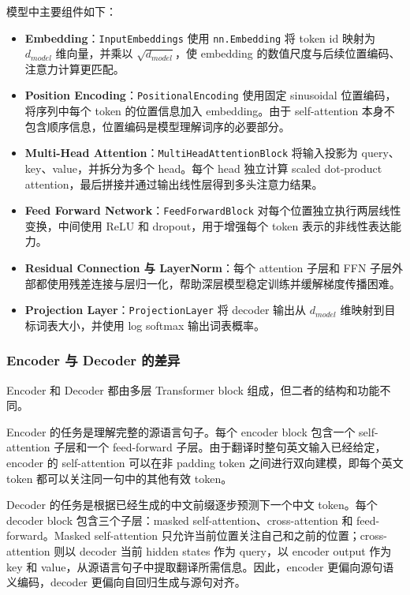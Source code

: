 ﻿\documentclass[UTF8,a4paper,12pt]{ctexart}
\begin{document}
模型中主要组件如下：
\begin{itemize}
  \item \textbf{Embedding}：\texttt{InputEmbeddings} 使用 \texttt{nn.Embedding} 将 token id 映射为 $d_{model}$ 维向量，并乘以 $\sqrt{d_{model}}$，使 embedding 的数值尺度与后续位置编码、注意力计算更匹配。
  \item \textbf{Position Encoding}：\texttt{PositionalEncoding} 使用固定 sinusoidal 位置编码，将序列中每个 token 的位置信息加入 embedding。由于 self-attention 本身不包含顺序信息，位置编码是模型理解词序的必要部分。
  \item \textbf{Multi-Head Attention}：\texttt{MultiHeadAttentionBlock} 将输入投影为 query、key、value，并拆分为多个 head。每个 head 独立计算 scaled dot-product attention，最后拼接并通过输出线性层得到多头注意力结果。
  \item \textbf{Feed Forward Network}：\texttt{FeedForwardBlock} 对每个位置独立执行两层线性变换，中间使用 ReLU 和 dropout，用于增强每个 token 表示的非线性表达能力。
  \item \textbf{Residual Connection 与 LayerNorm}：每个 attention 子层和 FFN 子层外部都使用残差连接与层归一化，帮助深层模型稳定训练并缓解梯度传播困难。
  \item \textbf{Projection Layer}：\texttt{ProjectionLayer} 将 decoder 输出从 $d_{model}$ 维映射到目标词表大小，并使用 log softmax 输出词表概率。
\end{itemize}

\subsubsection{Encoder 与 Decoder 的差异}

Encoder 和 Decoder 都由多层 Transformer block 组成，但二者的结构和功能不同。

Encoder 的任务是理解完整的源语言句子。每个 encoder block 包含一个 self-attention 子层和一个 feed-forward 子层。由于翻译时整句英文输入已经给定，encoder 的 self-attention 可以在非 padding token 之间进行双向建模，即每个英文 token 都可以关注同一句中的其他有效 token。

Decoder 的任务是根据已经生成的中文前缀逐步预测下一个中文 token。每个 decoder block 包含三个子层：masked self-attention、cross-attention 和 feed-forward。Masked self-attention 只允许当前位置关注自己和之前的位置；cross-attention 则以 decoder 当前 hidden states 作为 query，以 encoder output 作为 key 和 value，从源语言句子中提取翻译所需信息。因此，encoder 更偏向源句语义编码，decoder 更偏向自回归生成与源句对齐。
\end{document}
